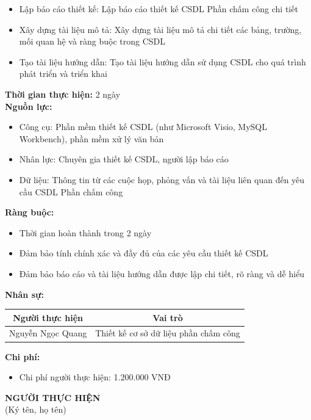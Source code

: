 {\begin{minipage}{\textwidth}
\begin{itemize}
        \item Lập báo cáo thiết kế: Lập báo cáo thiết kế CSDL Phần chấm công chi tiết
        \item Xây dựng tài liệu mô tả: Xây dựng tài liệu mô tả chi tiết các bảng, trường, mối quan hệ và ràng buộc trong CSDL
        \item Tạo tài liệu hướng dẫn: Tạo tài liệu hướng dẫn sử dụng CSDL cho quá trình phát triển và triển khai
    \end{itemize}
    \vspace{0.5cm}
    \noindent \textbf{Thời gian thực hiện:} 2 ngày \\
    \noindent \textbf{Nguồn lực:}
    \begin{itemize}
        \item Công cụ: Phần mềm thiết kế CSDL (như Microsoft Visio, MySQL Workbench), phần mềm xử lý văn bản
        \item Nhân lực: Chuyên gia thiết kế CSDL, người lập báo cáo
        \item Dữ liệu: Thông tin từ các cuộc họp, phỏng vấn và tài liệu liên quan đến yêu cầu CSDL Phần chấm công
    \end{itemize}
    \vspace{0.5cm}
    \noindent \textbf{Ràng buộc:}
    \begin{itemize}
        \item Thời gian hoàn thành trong 2 ngày
        \item Đảm bảo tính chính xác và đầy đủ của các yêu cầu thiết kế CSDL
        \item Đảm bảo báo cáo và tài liệu hướng dẫn được lập chi tiết, rõ ràng và dễ hiểu
    \end{itemize}
    \vspace{0.5cm}
    \noindent \textbf{Nhân sự:}
    \begin{longtable}{|c|c|}
    \hline
    \textbf{Người thực hiện} & \textbf{Vai trò} \\
    \hline
    Nguyễn Ngọc Quang & Thiết kế cơ sở dữ liệu phần chấm công \\
    \hline
    \end{longtable}
    \vspace{0.5cm}
    \noindent \textbf{Chi phí:}
    \begin{itemize}
        \item Chi phí người thực hiện: 1.200.000 VNĐ
    \end{itemize}
    \vspace{1cm}
    \begin{flushleft}
        \hspace{8cm} \textbf{NGƯỜI THỰC HIỆN} \\
        \hspace{8.8cm} (Ký tên, họ tên) \\
        \vspace{1cm}
    \end{flushleft}
    \end{minipage}
}
% 
